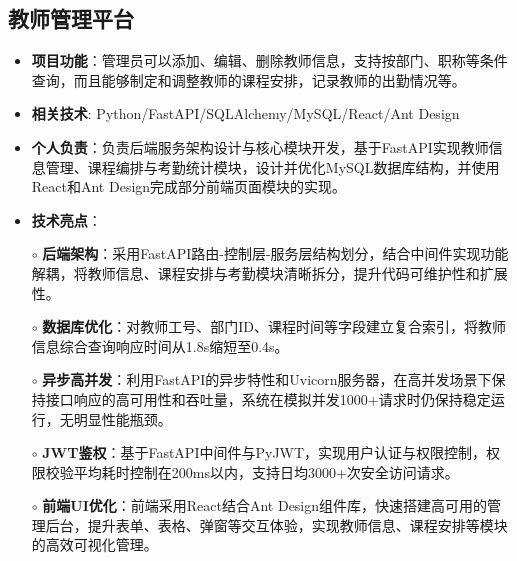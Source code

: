 \documentclass{resume}
\begin{document}
\subsection{\textbf{教师管理平台} \hspace{2cm}{2024.07 -- 2024.09}}
  \begin{normalsize}
    \begin{itemize}
    \item \textbf{项目功能}：管理员可以添加、编辑、删除教师信息，支持按部门、职称等条件查询，而且能够制定和调整教师的课程安排，记录教师的出勤情况等。
    \item \textbf{相关技术}: Python/FastAPI/SQLAlchemy/MySQL/React/Ant Design
    \item \textbf{个人负责}：负责后端服务架构设计与核心模块开发，基于FastAPI实现教师信息管理、课程编排与考勤统计模块，设计并优化MySQL数据库结构，并使用React和Ant Design完成部分前端页面模块的实现。
    \item \textbf{技术亮点}：
    \setlength{\itemindent}{1em} %
      \item[$\circ$] \textbf{后端架构}：采用FastAPI路由-控制层-服务层结构划分，结合中间件实现功能解耦，将教师信息、课程安排与考勤模块清晰拆分，提升代码可维护性和扩展性。
      \item[$\circ$] \textbf{数据库优化}：对教师工号、部门ID、课程时间等字段建立复合索引，将教师信息综合查询响应时间从1.8s缩短至0.4s。
      \item[$\circ$] \textbf{异步高并发}：利用FastAPI的异步特性和Uvicorn服务器，在高并发场景下保持接口响应的高可用性和吞吐量，系统在模拟并发1000+请求时仍保持稳定运行，无明显性能瓶颈。
      \item[$\circ$] \textbf{JWT鉴权}：基于FastAPI中间件与PyJWT，实现用户认证与权限控制，权限校验平均耗时控制在200ms以内，支持日均3000+次安全访问请求。
      \item[$\circ$] \textbf{前端UI优化}：前端采用React结合Ant Design组件库，快速搭建高可用的管理后台，提升表单、表格、弹窗等交互体验，实现教师信息、课程安排等模块的高效可视化管理。
    \end{itemize}
  \end{normalsize}
\end{document}
